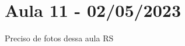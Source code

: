 \documentclass[algebra_notes.tex]{subfiles}
\begin{document}
\section{Aula 11 - 02/05/2023}
Preciso de fotos dessa aula RS
\newpage
\end{document}
